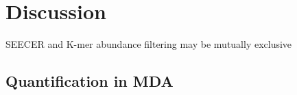 \section{Discussion}

SEECER and K-mer abundance filtering may be mutually exclusive

\subsection{Quantification in MDA}









